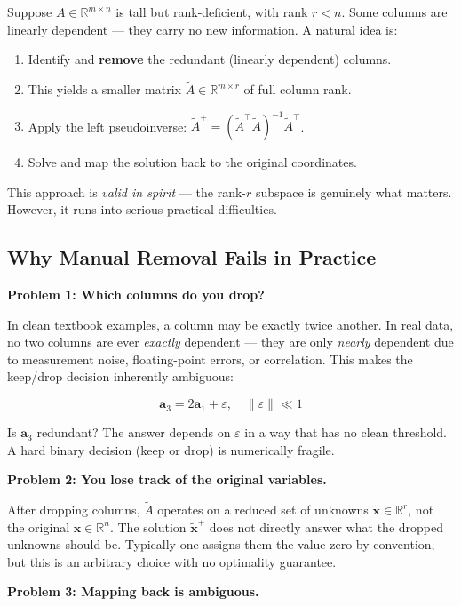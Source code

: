 \documentclass[12pt, a4paper]{article}
\theoremstyle{definition}
\begin{document}
Suppose $A \in \mathbb{R}^{m \times n}$ is tall but rank-deficient, with rank $r < n$. Some columns are
linearly dependent — they carry no new information. A natural idea is:

\begin{enumerate}
    \item Identify and \textbf{remove} the redundant (linearly dependent) columns.
    \item This yields a smaller matrix $\tilde{A} \in \mathbb{R}^{m \times r}$ of full column rank.
    \item Apply the left pseudoinverse: $\tilde{A}^+ = (\tilde{A}^\top \tilde{A})^{-1}\tilde{A}^\top$.
    \item Solve and map the solution back to the original coordinates.
\end{enumerate}

This approach is \emph{valid in spirit} — the rank-$r$ subspace is genuinely what matters. However,
it runs into serious practical difficulties.

\subsection{Why Manual Removal Fails in Practice}

\textbf{Problem 1: Which columns do you drop?}

In clean textbook examples, a column may be exactly twice another. In real data, no two columns are
ever \emph{exactly} dependent — they are only \emph{nearly} dependent due to measurement noise,
floating-point errors, or correlation. This makes the keep/drop decision inherently ambiguous:

\[
    \mathbf{a}_3 = 2\mathbf{a}_1 + \varepsilon, \quad \|\varepsilon\| \ll 1
\]

Is $\mathbf{a}_3$ redundant? The answer depends on $\varepsilon$ in a way that has no clean threshold.
A hard binary decision (keep or drop) is numerically fragile.

\textbf{Problem 2: You lose track of the original variables.}

After dropping columns, $\tilde{A}$ operates on a reduced set of unknowns
$\tilde{\mathbf{x}} \in \mathbb{R}^r$, not the original $\mathbf{x} \in \mathbb{R}^n$.
The solution $\tilde{\mathbf{x}}^+$ does not directly answer what the dropped unknowns should be.
Typically one assigns them the value zero by convention, but this is an arbitrary choice with no
optimality guarantee.

\textbf{Problem 3: Mapping back is ambiguous.}
\end{document}
